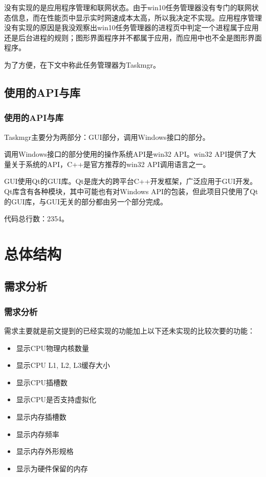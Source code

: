\documentclass{beamer}
\begin{document}
\begin{frame}
没有实现的是应用程序管理和联网状态。由于win10任务管理器没有专门的联网状态信息，而在性能页中显示实时网速成本太高，所以我决定不实现。应用程序管理没有实现的原因是我没观察出win10任务管理器的进程页中判定一个进程属于应用还是后台进程的规则；图形界面程序并不都属于应用，而应用中也不全是图形界面程序。

为了方便，在下文中称此任务管理器为Taskmgr。
\end{frame}

\subsection{使用的API与库}
\begin{frame}
    \frametitle{使用的API与库}

Taskmgr主要分为两部分：GUI部分，调用Windows接口的部分。

调用Windows接口的部分使用的操作系统API是win32 API。win32 API提供了大量关于系统的API，C++是官方推荐的win32 API调用语言之一。

GUI使用Qt的GUI库。Qt是庞大的跨平台C++开发框架，广泛应用于GUI开发。Qt库含有各种模块，其中可能也有对Windows API的包装，但此项目只使用了Qt的GUI库，与GUI无关的部分都由另一个部分完成。

代码总行数：2354。
\end{frame}

\section{总体结构}
\subsection{需求分析}
\begin{frame}
    \frametitle{需求分析}
    需求主要就是前文提到的已经实现的功能加上以下还未实现的比较次要的功能：

\begin{itemize}
    \item 显示CPU物理内核数量
    \item 显示CPU L1, L2, L3缓存大小
    \item 显示CPU插槽数
    \item 显示CPU是否支持虚拟化
    \item 显示内存插槽数
    \item 显示内存频率
    \item 显示内存外形规格
    \item 显示为硬件保留的内存
\end{itemize}
\end{frame}
\end{document}
